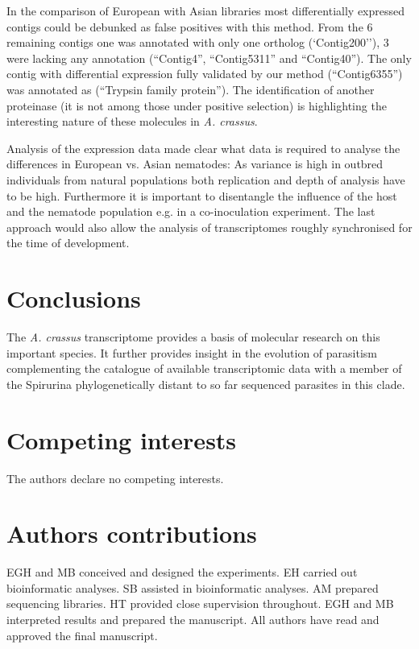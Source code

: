 \documentclass[10pt]{bmc_article}
\newenvironment{bmcformat}{\begin{raggedright}\baselineskip20pt\sloppy\setboolean{publ}{false}}{\end{raggedright}\baselineskip20pt\sloppy}
\begin{document}
\begin{bmcformat}
In the comparison of European with Asian libraries most
differentially expressed contigs could be debunked as false positives
with this method. From the 6 remaining contigs one was annotated with
only one ortholog (`Contig200''), 3 were lacking any annotation
(``Contig4'', ``Contig5311'' and ``Contig40''). The only contig with
differential expression fully validated by our method (``Contig6355'')
was annotated as (``Trypsin family protein''). The identification of
another proteinase (it is not among those under positive selection) is
highlighting the interesting nature of these molecules in
\textit{A. crassus}.

Analysis of the expression data made clear what data is required to
analyse the differences in European vs. Asian nematodes: As variance
is high in outbred individuals from natural populations both
replication and depth of analysis have to be high. Furthermore it is
important to disentangle the influence of the host and the nematode
population e.g. in a co-inoculation experiment. The last approach
would also allow the analysis of transcriptomes roughly synchronised
for the time of development.


\section*{Conclusions}

The \textit{A. crassus} transcriptome provides a basis of molecular
research on this important species. It further provides insight in
the evolution of parasitism complementing the catalogue of available
transcriptomic data with a member of the Spirurina phylogenetically
distant to so far sequenced parasites in this clade.

\section*{Competing interests}
The authors declare no competing interests.

\section*{Authors contributions}

EGH and MB conceived and designed the experiments. EH carried out
bioinformatic analyses. SB assisted in bioinformatic analyses. AM
prepared sequencing libraries. HT provided close supervision
throughout. EGH and MB interpreted results and prepared the
manuscript. All authors have read and approved the final manuscript.


\end{bmcformat}
\end{document}
